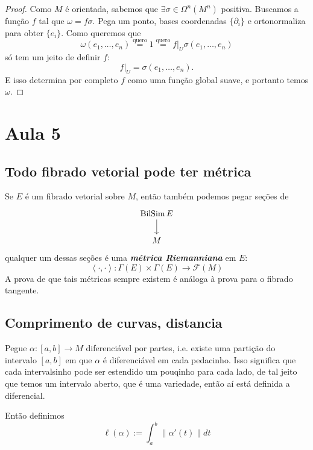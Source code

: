 \begin{proof}\leavevmode
Como \(M\) é orientada, sabemos que \(\exists  \sigma \in \Omega^{n}(M^n)\) positiva. Buscamos a função \(f\) tal que \(\omega=f\sigma\). Pega um ponto, bases coordenadas \(\{\partial_i\}\) e ortonormaliza para obter \(\{e_i\}\). Como queremos que
\[\omega(e_1,\ldots,e_n)\overset{\text{quero}}{=}1\overset{\text{quero}}{=}f|_{U}\sigma(e_1,\ldots,e_n)\]
só tem um jeito de definir \(f\):
\[f|_{U}=\sigma(e_1,\ldots,e_n).\]
E isso determina por completo \(f\) como uma função global suave, e portanto temos \(\omega\).
\end{proof}

\section{Aula 5}

\subsection{Todo fibrado vetorial pode ter métrica}

\begin{remark}\leavevmode
Se \(E\) é um fibrado vetorial sobre \(M\), então também podemos pegar seções de
 \[\begin{tikzcd}
\operatorname{B i l Si m}E\arrow[d]\\
M
\end{tikzcd}\]
qualquer um dessas seções é uma \textit{\textbf{métrica Riemanniana}} em \(E\):
\[\left<\cdot,\cdot\right>: \Gamma(E)\times \Gamma(E)\longrightarrow \mathcal{F}(M)\]
A prova de que tais métricas sempre existem é análoga à prova para o fibrado tangente.
\end{remark}

\subsection{Comprimento de curvas, distancia}

Pegue \(\alpha:[a,b]\longrightarrow M\) diferenciável por partes, i.e. existe uma partição do intervalo \([a,b]\) em que \(\alpha\) é diferenciável em cada pedacinho. Isso significa que cada intervalsinho pode ser estendido um pouqinho para cada lado, de tal jeito que temos um intervalo aberto, que é uma variedade, então aí está definida a diferencial.

Então definimos
\[\ell(\alpha):=\int_a^b \|\alpha'(t)\|dt\]

